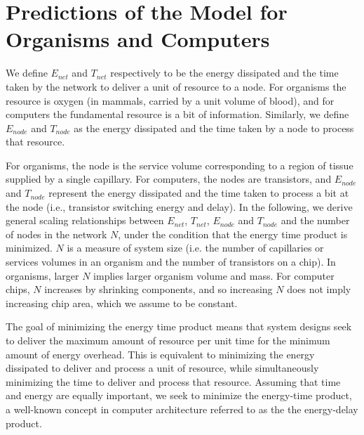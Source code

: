 \documentclass[12pt]{article}
\begin{document}
\section{Predictions of the Model for Organisms and Computers}

We define $E_{net}$ and $T_{net}$ respectively to be the energy dissipated and the 
time taken by the network to deliver a unit of resource to a node.  
For organisms the resource is oxygen (in mammals, carried by a unit volume of blood), and for computers
the fundamental resource is a bit of information.  
Similarly, we define $E_{node}$ and $T_{node}$ as the 
energy dissipated and the time taken by a node to process that resource.


For organisms, the node is the service volume 
corresponding to a region of tissue supplied by a single capillary.  
For computers, the nodes are transistors, and 
$E_{node}$ and $T_{node}$ represent the energy dissipated and 
the time taken to process a bit at the node (i.e., transistor 
switching energy and delay).  In the following, we derive general 
scaling relationships between $E_{net}$, $T_{net}$, $E_{node}$ and $T_{node}$ and the number of nodes in the network $N$, under the condition that the energy time product is minimized.  $N$ is a measure of system size (i.e. the number of capillaries or services volumes in an organism and the number of transistors on a chip). In organisms, larger $N$ implies larger organism volume and mass. For computer chips, $N$ increases by shrinking components, and so increasing $N$ does not imply increasing chip area, which we assume to be constant.

The goal of minimizing the energy time product means that system designs seek to deliver the maximum amount of resource per unit time for 
the minimum amount of energy overhead.   This is equivalent to minimizing the energy dissipated to deliver and process a unit of resource, while simultaneously minimizing the time to deliver and process that resource.  Assuming that time and energy are
equally important, we seek to minimize the energy-time product, 
a well-known concept in computer architecture referred to as the
the energy-delay product.  
\end{document}
